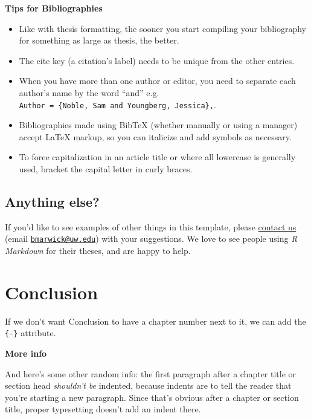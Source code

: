 \documentclass[ms]{uncgdissertationexp}
\providecommand{\tightlist}{
  \setlength{\itemsep}{0pt}\setlength{\parskip}{0pt}}
\def\tightlist{}
\theoremstyle{plain}
\theoremstyle{definition}
\theoremstyle{remark}
\begin{document}
  \textbf{Tips for Bibliographies}
  \begin{itemize}
  \tightlist
  \item
    Like with thesis formatting, the sooner you start compiling your
    bibliography for something as large as thesis, the better.
  \item
    The cite key (a citation's label) needs to be unique from the other
    entries.
  \item
    When you have more than one author or editor, you need to separate
    each author's name by the word ``and'' e.g.
    \texttt{Author\ =\ \{Noble,\ Sam\ and\ Youngberg,\ Jessica\},}.
  \item
    Bibliographies made using BibTeX (whether manually or using a manager)
    accept LaTeX markup, so you can italicize and add symbols as
    necessary.
  \item
    To force capitalization in an article title or where all lowercase is
    generally used, bracket the capital letter in curly braces.
  \end{itemize}
  \section{Anything else?}\label{anything-else}
  
  If you'd like to see examples of other things in this template, please
  \href{https://github.com/benmarwick/huskydown/issues/new}{contact us}
  (email \href{mailto:bmarwick@uw.edu}{\nolinkurl{bmarwick@uw.edu}}) with
  your suggestions. We love to see people using \emph{R Markdown} for
  their theses, and are happy to help.
  
  \chapter*{Conclusion}\label{conclusion}
  
  If we don't want Conclusion to have a chapter number next to it, we can
  add the \texttt{\{-\}} attribute.
  
  \textbf{More info}
  
  And here's some other random info: the first paragraph after a chapter
  title or section head \emph{shouldn't be} indented, because indents are
  to tell the reader that you're starting a new paragraph. Since that's
  obvious after a chapter or section title, proper typesetting doesn't add
  an indent there.
  
  \appendix
  
\end{document}
